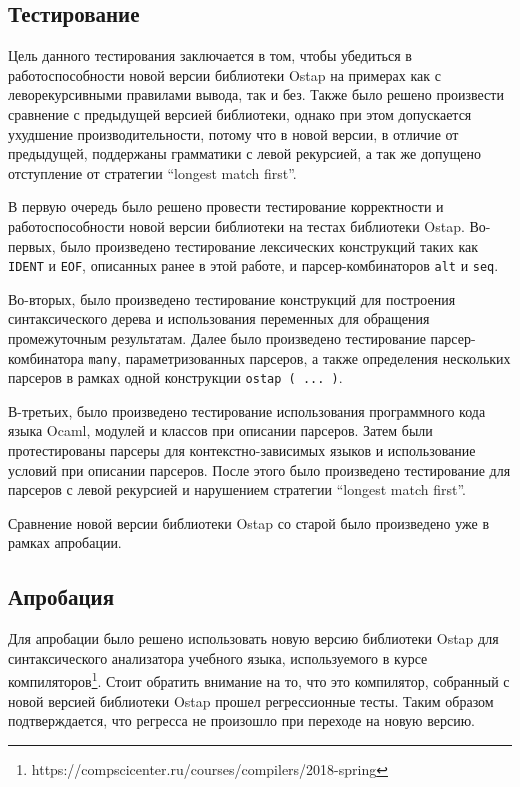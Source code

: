 \subsection{Тестирование}

Цель данного тестирования заключается в том, чтобы убедиться в работоспособности новой версии библиотеки Ostap на примерах как с леворекурсивными правилами вывода, так и без. Также было решено произвести сравнение с предыдущей версией библиотеки, однако при этом допускается ухудшение производительности, потому что в новой версии, в отличие от предыдущей, поддержаны грамматики с левой рекурсией, а так же допущено отступление от стратегии ``longest match first''.

В первую очередь было решено провести тестирование корректности и работоспособности новой версии библиотеки на тестах библиотеки Ostap. Во-первых, было произведено тестирование лексических конструкций таких как \lstinline|IDENT| и \lstinline|EOF|, описанных ранее в этой работе, и парсер-комбинаторов  \lstinline|alt| и  \lstinline|seq|.

Во-вторых, было произведено тестирование конструкций для построения синтаксического дерева и использования переменных для обращения промежуточным результатам. Далее было произведено тестирование парсер-комбинатора \lstinline|many|, параметризованных парсеров, а также определения нескольких парсеров в рамках одной конструкции \lstinline|ostap ( ... )|.

В-третьих, было произведено тестирование использования программного кода языка Ocaml, модулей и классов при описании парсеров. Затем были протестированы парсеры для контекстно-зависимых языков и использование условий при описании парсеров. После этого было произведено тестирование для парсеров с левой рекурсией и нарушением стратегии ``longest match first''.

Сравнение новой версии библиотеки Ostap со старой было произведено уже в рамках апробации.

\subsection{Апробация}

Для апробации было решено использовать новую версию библиотеки Ostap для синтаксического анализатора учебного языка, используемого в курсе
компиляторов\footnote{https://compscicenter.ru/courses/compilers/2018-spring}. Стоит обратить внимание на то, что это компилятор, собранный с новой версией библиотеки Ostap прошел регрессионные тесты. Таким образом подтверждается, что регресса не произошло при переходе на новую версию.

